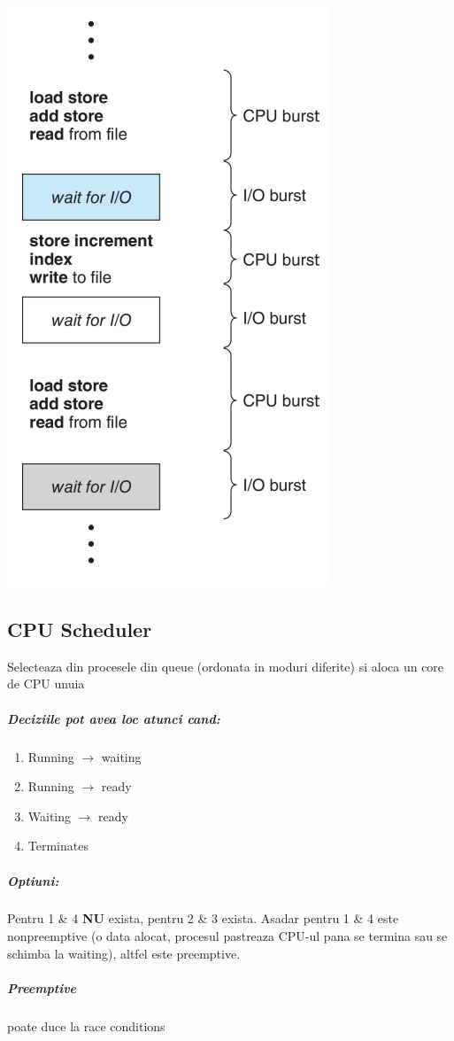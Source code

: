 \documentclass{article}
\begin{document}
\begin{center}
    \includegraphics[scale=0.3]{11_cpuioburstcycle.png}
\end{center}

\subsection*{CPU Scheduler} Selecteaza din procesele din queue (ordonata in moduri diferite) si aloca un core de CPU unuia
\subparagraph*{Deciziile pot avea loc atunci cand:}
\begin{enumerate}
    \item Running $\rightarrow$ waiting
    \item Running $\rightarrow$ ready
    \item Waiting $\rightarrow$ ready
    \item Terminates
\end{enumerate}
\subparagraph*{Optiuni:} Pentru 1 \& 4 \textbf{NU} exista, pentru 2 \& 3 exista. Asadar pentru 1 \& 4 este nonpreemptive (o data alocat, procesul pastreaza CPU-ul pana se termina sau se schimba la waiting), altfel este preemptive.
\subparagraph*{Preemptive} poate duce la race conditions
\end{document}
